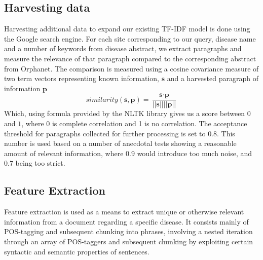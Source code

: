 \documentclass[10pt,letterpaper,final]{article}
\begin{document}
\subsection{Harvesting data}
Harvesting additional data to expand our existing TF-IDF model is done
using the Google search engine. For each site corresponding to our
query, disease name and a number of keywords from disease abstract, we
extract paragraphs and measure the relevance of that paragraph compared
to the corresponding abstract from Orphanet. The comparison is measured
using a cosine covariance measure of two term vectors representing
known information, $\textbf{s}$ and a harvested paragraph of information
$\textbf{p}$
\[
similarity(\textbf{s}, \textbf{p}) = \frac{\textbf{s} \cdot \textbf{p}}{||\textbf{s}|| ||\textbf{p}||}
\]
Which, using formula provided by the NLTK library gives us a score
between $0$ and $1$, where 0 is complete correlation and 1 is no
correlation. The acceptance threshold for paragraphs collected for
further processing is set to $0.8$. This number is used based on a
number of anecdotal tests showing a reasonable amount of relevant
information, where $0.9$ would introduce too much noise, and $0.7$
being too strict.



\subsection{Feature Extraction}
Feature extraction is used as a means to extract unique or otherwise
relevant information from a document regarding a specific disease. It
consists mainly of POS-tagging and subsequent chunking into phrases,
involving a nested iteration through an array of POS-taggers and
subsequent chunking by exploiting certain syntactic and semantic
properties of sentences.
\end{document}
